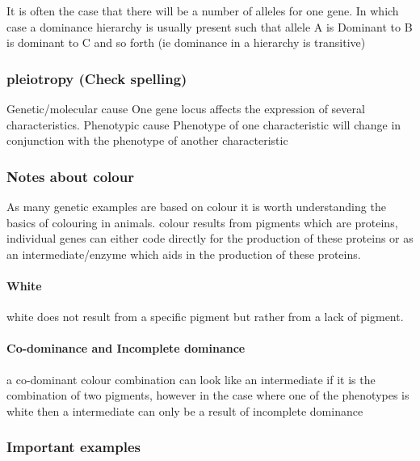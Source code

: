 \documentclass[]{article}
\let\oldparagraph\paragraph
\renewcommand{\paragraph}[1]{\oldparagraph{#1}\mbox{}}
\begin{document}
It is often the case that there will be a number of alleles for one
gene. In which case a dominance hierarchy is usually present such that
allele A is Dominant to B is dominant to C and so forth (ie dominance in
a hierarchy is transitive)

\hypertarget{pleiotropy-check-spelling}{%
\subsubsection{pleiotropy (Check
spelling)}\label{pleiotropy-check-spelling}}

Genetic/molecular cause One gene locus affects the expression of several
characteristics. Phenotypic cause Phenotype of one characteristic will
change in conjunction with the phenotype of another characteristic

\hypertarget{notes-about-colour}{%
\subsubsection{Notes about colour}\label{notes-about-colour}}

As many genetic examples are based on colour it is worth understanding
the basics of colouring in animals. colour results from pigments which
are proteins, individual genes can either code directly for the
production of these proteins or as an intermediate/enzyme which aids in
the production of these proteins.

\hypertarget{white}{%
\paragraph{White}\label{white}}

white does not result from a specific pigment but rather from a lack of
pigment.

\hypertarget{co-dominance-and-incomplete-dominance}{%
\paragraph{Co-dominance and Incomplete
dominance}\label{co-dominance-and-incomplete-dominance}}

a co-dominant colour combination can look like an intermediate if it is
the combination of two pigments, however in the case where one of the
phenotypes is white then a intermediate can only be a result of
incomplete dominance

\hypertarget{important-examples}{%
\subsubsection{Important examples}\label{important-examples}}
\end{document}
